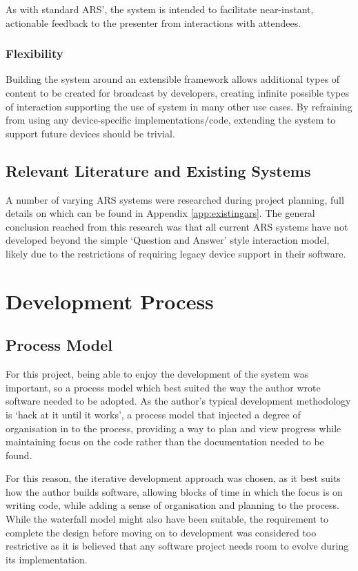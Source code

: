 \documentclass[a4papert,11pt,notitlepage]{article}
\begin{document}
As with standard ARS', the system is intended to facilitate near-instant, actionable feedback to the presenter from interactions with attendees.

\subsubsection{Flexibility}
Building the system around an extensible framework allows additional types of content to be created for broadcast by developers, creating infinite possible types of interaction supporting the use of system in many other use cases. By refraining from using any device-specific implementations/code, extending the system to support future devices should be trivial.

\subsection{Relevant Literature and Existing Systems}
A number of varying ARS systems were researched during project planning, full details on which can be found in Appendix \ref{app:existingars}. The general conclusion reached from this research was that all current ARS systems have not developed beyond the simple `Question and Answer' style interaction model, likely due to the restrictions of requiring legacy device support in their software.

\pagebreak

\section{Development Process}
\subsection{Process Model}
For this project, being able to enjoy the development of the system was important, so a process model which best suited the way the author wrote software needed to be adopted. As the author's typical development methodology is `hack at it until it works', a process model that injected a degree of organisation in to the process, providing a way to plan and view progress while maintaining focus on the code rather than the documentation needed to be found.

For this reason, the iterative development\cite{iterativedevelopment:web} approach was chosen, as it best suits how the author builds software, allowing blocks of time in which the focus is on writing code, while adding a sense of organisation and planning to the process. While the waterfall model\cite{waterfallmodel:web} might also have been suitable, the requirement to complete the design before moving on to development was considered too restrictive as it is believed that any software project needs room to evolve during its implementation.
\end{document}
